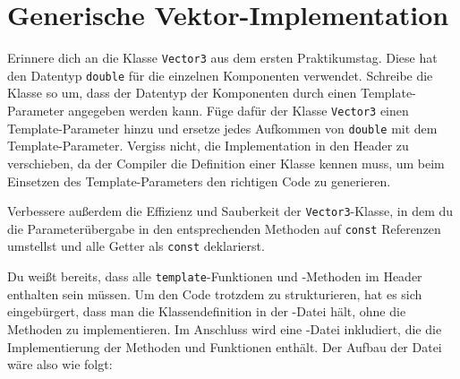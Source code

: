 \section{Generische Vektor-Implementation}
Erinnere dich an die Klasse \lstinline{Vector3} aus dem ersten Praktikumstag.
Diese hat den Datentyp \lstinline{double} für die einzelnen Komponenten verwendet.
Schreibe die Klasse so um, dass der Datentyp der Komponenten durch einen Template-Parameter angegeben werden kann.
Füge dafür der Klasse \lstinline{Vector3} einen Template-Parameter hinzu und ersetze jedes Aufkommen von \lstinline{double} mit dem Template-Parameter.
Vergiss nicht, die Implementation in den Header zu verschieben, da der Compiler die Definition einer Klasse kennen muss, um beim Einsetzen des Template-Parameters den richtigen Code zu generieren.

Verbessere außerdem die Effizienz und Sauberkeit der \lstinline{Vector3}-Klasse, in dem du die Parameterübergabe in den entsprechenden Methoden auf \lstinline{const} Referenzen umstellst und alle Getter als \lstinline{const} deklarierst.

Du weißt bereits, dass alle \lstinline{template}-Funktionen und -Methoden im Header enthalten sein müssen.
Um den Code trotzdem zu strukturieren, hat es sich eingebürgert, dass man die Klassendefinition in der -Datei hält, ohne die Methoden zu implementieren.
Im Anschluss wird eine -Datei inkludiert, die die Implementierung der Methoden und Funktionen enthält.
%
Der Aufbau der Datei  wäre also wie folgt:


